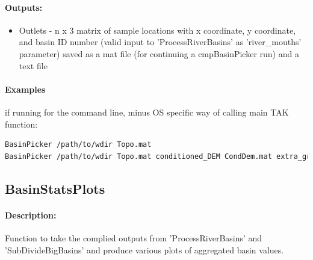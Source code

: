 \paragraph{Outputs:}
\begin{itemize}
\item Outlets - n x 3 matrix of sample locations with x coordinate, y coordinate, and basin ID number (valid input to 'ProcessRiverBasins'
as 'river\_mouths' parameter) saved as a mat file (for continuing a cmpBasinPicker run) and a text file
\end{itemize}

\paragraph{Examples} if running for the command line, minus OS specific way of calling main TAK function:
\begin{lstlisting}[language=bash]
BasinPicker /path/to/wdir Topo.mat
BasinPicker /path/to/wdir Topo.mat conditioned_DEM CondDem.mat extra_grid precip.tif
\end{lstlisting}

\subsection{BasinStatsPlots}
\paragraph{Description:}
Function to take the complied outputs from 'ProcessRiverBasins' and 'SubDivideBigBasins' and produce various plots
of aggregated basin values. 


